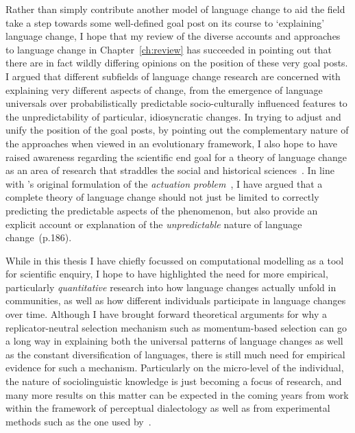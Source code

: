 
Rather than simply contribute another model of language change to aid the field take a step towards some well-defined goal post on its course to `explaining' language change, I hope that my review of the diverse accounts and approaches to language change in Chapter~\ref{ch:review} has succeeded in pointing out that there are in fact wildly differing opinions on the position of these very goal posts. I argued that different subfields of language change research are concerned with explaining very different aspects of change, from the emergence of language universals over probabilistically predictable socio-culturally influenced features to the unpredictability of particular, idiosyncratic changes.
In trying to adjust and unify the position of the goal posts, by pointing out the complementary nature of the approaches when viewed in an evolutionary framework, I also hope to have raised awareness regarding the scientific end goal for a theory of language change as an area of research that straddles the social and historical sciences~\citep{Blute1997}. In line with \citeauthor{Weinreich1968}'s original formulation of the \emph{actuation problem}~\citeyearpar{Weinreich1968}, I have argued that a complete theory of language change should not just be limited to correctly predicting the predictable aspects of the phenomenon, but also provide an explicit account or explanation of the \emph{unpredictable} nature of language change~(p.186).

While in this thesis I have chiefly focussed on computational modelling as a tool for scientific enquiry, I hope to have highlighted the need for more empirical, particularly \emph{quantitative} research into how language changes actually unfold in communities, as well as how different individuals participate in language changes over time.
Although I have brought forward theoretical arguments for why a replicator-neutral selection mechanism such as momentum-based selection can go a long way in explaining both the universal patterns of language changes as well as the constant diversification of languages, there is still much need for empirical evidence for such a mechanism. Particularly on the micro-level of the individual, the nature of sociolinguistic knowledge is just becoming a focus of research, and many more results on this matter can be expected in the coming years from work within the framework of perceptual dialectology as well as from experimental methods such as the one used by~\citet{Drager2011}.

